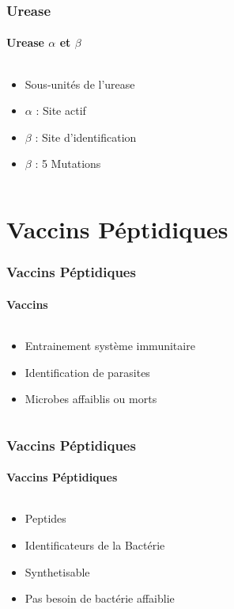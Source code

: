 \documentclass[11pt, notes, handout]{beamer}
\begin{document}
\begin{frame}
\frametitle{Urease}
\framesubtitle{Urease $\alpha$ et $\beta$}
\begin{columns}[c]
	\begin{column}[c]{5cm}
		\begin{itemize}[<+->]
			\item Sous-unités de l'urease
			\item $\alpha$ : Site actif
			\item $\beta$ : Site d'identification
			\item $\beta$ : 5 Mutations
		\end{itemize}
	\end{column}
	\begin{column}[c]{5cm}
	\end{column}
\end{columns}
\end{frame}

\section{Vaccins Péptidiques}
\begin{frame}
\frametitle{Vaccins Péptidiques}
\framesubtitle{Vaccins}
\begin{columns}[c]
	\begin{column}[c]{5cm}
		\begin{itemize}[<+->]
			\item Entrainement système immunitaire
			\item Identification de parasites
			\item Microbes affaiblis ou morts
		\end{itemize}
	\end{column}
	\begin{column}[c]{5cm}
	\end{column}
\end{columns}
\end{frame}

\begin{frame}
\frametitle{Vaccins Péptidiques}
\framesubtitle{Vaccins Péptidiques}
\begin{columns}[c]
	\begin{column}[c]{5cm}
		\begin{itemize}[<+->]
			\item Peptides
			\item Identificateurs de la Bactérie
			\item Synthetisable
			\item Pas besoin de bactérie affaiblie
		\end{itemize}
	\end{column}
	\begin{column}[c]{5cm}
	\end{column}
\end{columns}
\end{frame}
\end{document}
